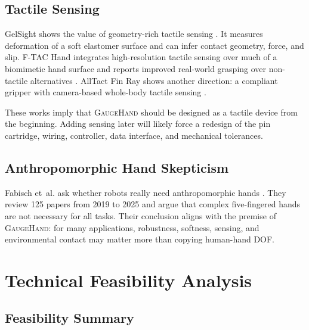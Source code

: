 \documentclass[11pt]{article}
\newcommand{\GaugeHand}{\textsc{GaugeHand}}
\newcommand{\etal}{et~al.}
\begin{document}
\subsection{Tactile Sensing}

GelSight shows the value of geometry-rich tactile sensing \cite{yuan2017gelsight}. It measures deformation of a soft elastomer surface and can infer contact geometry, force, and slip. F-TAC Hand integrates high-resolution tactile sensing over much of a biomimetic hand surface and reports improved real-world grasping over non-tactile alternatives \cite{zhu2025ftac}. AllTact Fin Ray shows another direction: a compliant gripper with camera-based whole-body tactile sensing \cite{liang2025alltact}.

These works imply that \GaugeHand{} should be designed as a tactile device from the beginning. Adding sensing later will likely force a redesign of the pin cartridge, wiring, controller, data interface, and mechanical tolerances.

\subsection{Anthropomorphic Hand Skepticism}

Fabisch \etal{} ask whether robots really need anthropomorphic hands \cite{fabisch2025anthropomorphic}. They review 125 papers from 2019 to 2025 and argue that complex five-fingered hands are not necessary for all tasks. Their conclusion aligns with the premise of \GaugeHand{}: for many applications, robustness, softness, sensing, and environmental contact may matter more than copying human-hand DOF.

\section{Technical Feasibility Analysis}

\subsection{Feasibility Summary}
\end{document}
